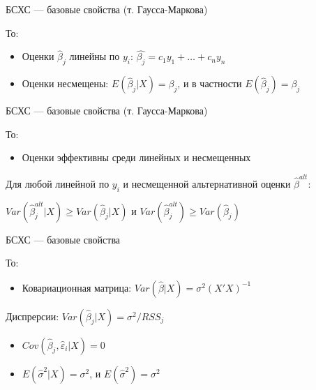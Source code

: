 \documentclass[russian,ignorenonframetext,]{beamer}
\providecommand{\tightlist}{%
  \setlength{\itemsep}{0pt}\setlength{\parskip}{0pt}}
\begin{document}
\begin{frame}{БСХС --- базовые свойства (т. Гаусса-Маркова)}

То:

\begin{itemize}
\item
  Оценки \(\hat{\beta}_j\) линейны по \(y_i\):
  \(\hat{\beta_j}=c_1 y_1 + \ldots + c_n y_n\)
\item
  Оценки несмещены: \(E(\hat{\beta}_j |X )=\beta_j\), и в частности
  \(E(\hat{\beta}_j)=\beta_j\)
\end{itemize}

\end{frame}

\begin{frame}{БСХС --- базовые свойства (т. Гаусса-Маркова)}

То:

\begin{itemize}
\tightlist
\item
  Оценки эффективны среди линейных и несмещенных
\end{itemize}

Для любой линейной по \(y_i\) и несмещенной альтернативной оценки
\(\hat{\beta}^{alt}\):

\(Var(\hat{\beta}_j^{alt} | X)\geq Var(\hat{\beta}_j | X)\) и
\(Var(\hat{\beta}_j^{alt} )\geq Var(\hat{\beta}_j )\)

\end{frame}

\begin{frame}{БСХС --- базовые свойства}

То:

\begin{itemize}
\tightlist
\item
  Ковариационная матрица: \(Var(\hat{\beta} | X )=\sigma^2 (X'X)^{-1}\)
\end{itemize}

Диспрерсии: \(Var(\hat{\beta}_j| X)=\sigma^2/RSS_j\)

\begin{itemize}
\tightlist
\item
  \(Cov(\hat{\beta}_j,\hat{\varepsilon}_i | X)=0\)
\item
  \(E(\hat{\sigma}^2 |X ) = \sigma^2\), и
  \(E(\hat{\sigma}^2 ) = \sigma^2\)
\end{itemize}

\end{frame}
\end{document}
